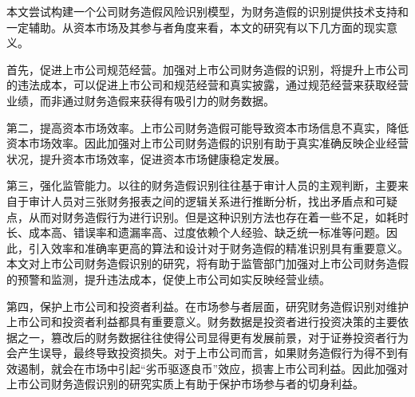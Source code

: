 
本文尝试构建一个公司财务造假风险识别模型，为财务造假的识别提供技术支持和一定辅助。从资本市场及其参与者角度来看，本文的研究有以下几方面的现实意义。

首先，促进上市公司规范经营。加强对上市公司财务造假的识别，将提升上市公司的违法成本，可以促进上市公司和规范经营和真实披露，通过规范经营来获取经营业绩，而非通过财务造假来获得有吸引力的财务数据。

第二，提高资本市场效率。上市公司财务造假可能导致资本市场信息不真实，降低资本市场效率。因此加强对上市公司财务造假的识别有助于真实准确反映企业经营状况，提升资本市场效率，促进资本市场健康稳定发展。

第三，强化监管能力。以往的财务造假识别往往基于审计人员的主观判断，主要来自于审计人员对三张财务报表之间的逻辑关系进行推断分析，找出矛盾点和可疑点，从而对财务造假行为进行识别。但是这种识别方法也存在着一些不足，如耗时长、成本高、错误率和遗漏率高、过度依赖个人经验、缺乏统一标准等问题。因此，引入效率和准确率更高的算法和设计对于财务造假的精准识别具有重要意义。本文对上市公司财务造假识别的研究，将有助于监管部门加强对上市公司财务造假的预警和监测，提升违法成本，促使上市公司如实反映经营业绩。

第四，保护上市公司和投资者利益。在市场参与者层面，研究财务造假识别对维护上市公司和投资者利益都具有重要意义。财务数据是投资者进行投资决策的主要依据之一，篡改后的财务数据往往使得公司显得更有发展前景，对于证券投资者行为会产生误导，最终导致投资损失。对于上市公司而言，如果财务造假行为得不到有效遏制，就会在市场中引起“劣币驱逐良币”效应，损害上市公司利益。因此加强对上市公司财务造假识别的研究实质上有助于保护市场参与者的切身利益。